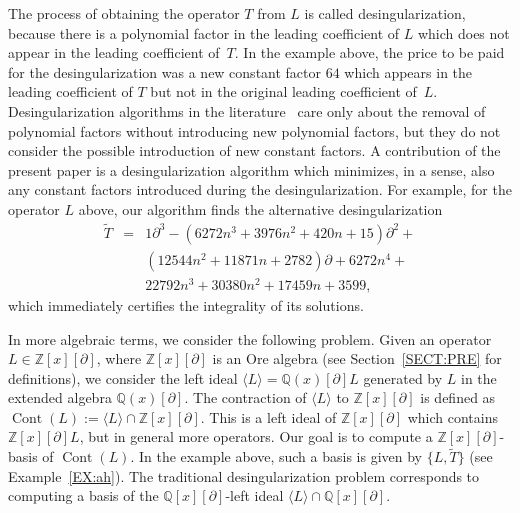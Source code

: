 \documentclass{sig-alternate}
\newcommand{\bQ} { {\mathbb{Q}}}
\newcommand{\bZ} { {\mathbb{Z}}}
\newcommand{\cont}{\operatorname{Cont}}
\newcommand{\pa}{\partial}
\begin{document}
The process of obtaining the operator $T$ from $L$ is called
desingularization, because there is a polynomial factor in the
leading coefficient of $L$ which does not appear in the leading
coefficient of~$T$. In the example above, the price to be paid
for the desingularization was a new constant factor $64$ which
appears in the leading coefficient of $T$ but not in the original
leading coefficient of~$L$. Desingularization algorithms in the
literature~\cite{Abramov1999, Abramov2006, Barkatou2015, Chen2013, Chen2016}
care only about the removal of polynomial
factors without introducing new polynomial factors, but they do not
consider the possible introduction of new constant factors.
A contribution of the present paper is a desingularization
algorithm which minimizes, in a sense, also any constant factors
introduced during the desingularization. For example, for the
operator $L$ above, our algorithm finds the alternative desingularization
\begin{equation} \label{EQ:ah}
\begin{array}{ccl}
\tilde{T}  & = & 1\pa^3 -\left(6272 n^3+3976 n^2+420 n+15\right) \pa^2 + \\
          &   & \left(12544 n^2+11871 n + 2782\right) \pa + 6272 n^4+ \\
          &   & 22792 n^3+30380 n^2 + 17459 n+3599,
\end{array}
\end{equation}
which immediately certifies the integrality of its solutions.

In more algebraic terms, we consider the following problem. Given
an operator $L\in \bZ[x][\pa]$, where $\bZ[x][\pa]$
is an Ore algebra (see Section~\ref{SECT:PRE} for definitions), we consider
the left ideal $\langle L \rangle = \bQ(x)[\pa]L$ generated by $L$ in the
extended algebra $\bQ(x)[\pa]$. The contraction of $\langle L \rangle$ to
$\bZ[x][\pa]$ is defined as $\cont(L) := \langle L \rangle \cap
\bZ[x][\pa]$. This is a left ideal of $\bZ[x][\pa]$ which
contains $\bZ[x][\pa]L$, but in general more operators.
Our goal is to compute a $\bZ[x][\pa]$-basis of $\cont(L)$.
In the example above, such a basis is given by $\{L, \tilde T\}$ (see Example~\ref{EX:ah}).
The traditional desingularization problem corresponds to computing
a basis of the $\bQ[x][\pa]$-left ideal $\langle L \rangle \cap \bQ[x][\pa]$.
\end{document}

